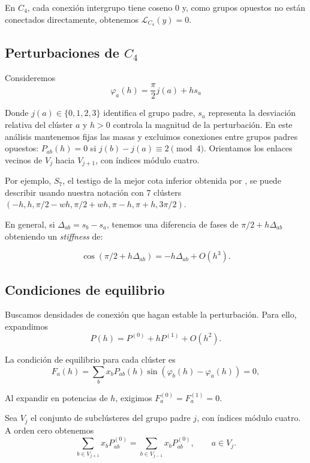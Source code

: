En \(C_4\), cada conexión intergrupo tiene coseno 0 y, como grupos opuestos no están conectados directamente, obtenemos \(\mathcal{L}_{C_4}(y)=0\).

\subsection{Perturbaciones de \(C_4\)}

Consideremos
\begin{equation}
    \varphi_a(h) = \frac{\pi}{2}j(a) + hs_a
\end{equation}

Donde \(j(a)\in\{0,1,2,3\}\) identifica el grupo padre, \(s_a\) representa la desviación relativa del clúster \(a\) y \(h>0\) controla la magnitud de la perturbación. En este análisis mantenemos fijas las masas y excluimos
conexiones entre grupos padres opuestos:
\(P_{ab}(h)=0\) si \(j(b)-j(a)\equiv2\pmod4\).
Orientamos los enlaces vecinos de \(V_j\) hacia \(V_{j+1}\),
con índices módulo cuatro.

Por ejemplo, \(S_7\), el testigo de la mejor cota inferior obtenida por \cite{okeeffe20261116densekuramotonetworks}, se puede describir usando nuestra notación con 7 clústers \((-h,h,\pi/2-wh,\pi/2+wh, \pi-h, \pi+h, 3\pi/2)\).

En general, si \(\Delta_{ab} = s_b - s_a\), tenemos una diferencia de fases de \(\pi/2 + h\Delta_{ab}\) obteniendo un \textit{stiffness} de:

\[
\cos(\pi/2+h\Delta_{ab})
=-h\Delta_{ab}+O(h^3).
\]

\subsection{Condiciones de equilibrio}

Buscamos densidades de conexión que hagan estable
la perturbación. Para ello, expandimos
\begin{equation}
    P(h)=P^{(0)}+hP^{(1)}+O(h^2).
\end{equation}

La condición de equilibrio para cada clúster es
\begin{equation}
    F_a(h)=\sum_b x_bP_{ab}(h)
    \sin(\varphi_b(h)-\varphi_a(h))=0,
\end{equation}

Al expandir en potencias de $h$, exigimos
$F_a^{(0)}=F_a^{(1)}=0$.

Sea $V_j$ el conjunto de subclústeres del grupo
padre $j$, con índices módulo cuatro.
A orden cero obtenemos
\begin{equation}
    \sum_{b\in V_{j+1}}x_bP_{ab}^{(0)}
    =
    \sum_{b\in V_{j-1}}x_bP_{ab}^{(0)},
    \qquad a\in V_j.
    \label{eq:equilibrio_cero}
\end{equation}

